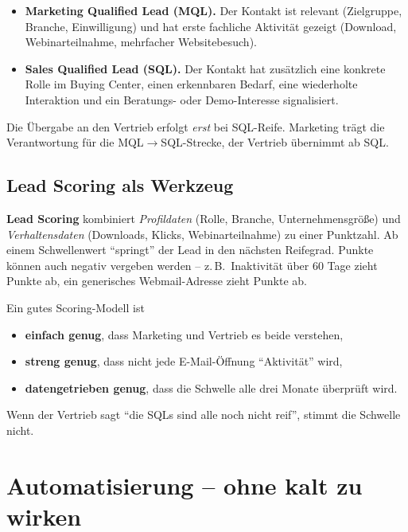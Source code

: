 \documentclass[11pt,a4paper,oneside]{article}
\newcommand{\fachbegriff}[1]{\textbf{#1}}
\begin{document}
\begin{itemize}
  \item \fachbegriff{Marketing Qualified Lead (MQL).} Der Kontakt ist relevant (Zielgruppe, Branche, Einwilligung) und hat erste fachliche Aktivität gezeigt (Download, Webinarteilnahme, mehrfacher Websitebesuch).
  \item \fachbegriff{Sales Qualified Lead (SQL).} Der Kontakt hat zusätzlich eine konkrete Rolle im Buying Center, einen erkennbaren Bedarf, eine wiederholte Interaktion und ein Beratungs- oder Demo-Interesse signalisiert.
\end{itemize}

Die Übergabe an den Vertrieb erfolgt \emph{erst} bei SQL-Reife. Marketing trägt die Verantwortung für die MQL$\rightarrow$SQL-Strecke, der Vertrieb übernimmt ab SQL.

\subsection{Lead Scoring als Werkzeug}

\fachbegriff{Lead Scoring} kombiniert \emph{Profildaten} (Rolle, Branche, Unternehmensgröße) und \emph{Verhaltensdaten} (Downloads, Klicks, Webinarteilnahme) zu einer Punktzahl. Ab einem Schwellenwert ``springt'' der Lead in den nächsten Reifegrad. Punkte können auch negativ vergeben werden -- z.\,B.\ Inaktivität über 60 Tage zieht Punkte ab, ein generisches Webmail-Adresse zieht Punkte ab.

\begin{merkbox}
Ein gutes Scoring-Modell ist
\begin{itemize}
  \item \textbf{einfach genug}, dass Marketing und Vertrieb es beide verstehen,
  \item \textbf{streng genug}, dass nicht jede E-Mail-Öffnung ``Aktivität'' wird,
  \item \textbf{datengetrieben genug}, dass die Schwelle alle drei Monate überprüft wird.
\end{itemize}
\noindent Wenn der Vertrieb sagt ``die SQLs sind alle noch nicht reif'', stimmt die Schwelle nicht.
\end{merkbox}

\section{Automatisierung -- ohne kalt zu wirken}
\end{document}

